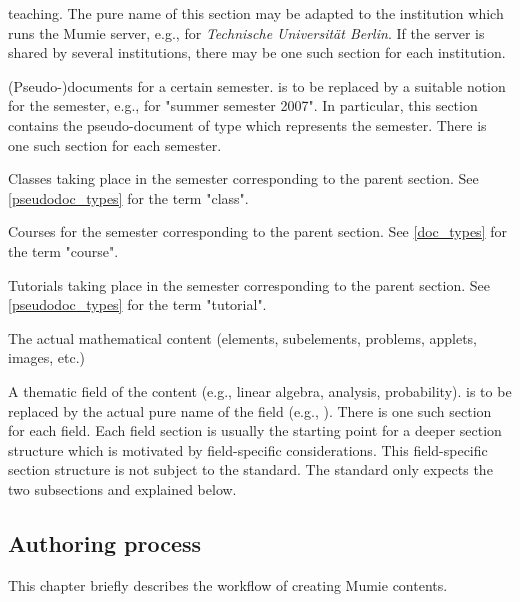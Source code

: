 \documentclass{generic}
\begin{document}
\begin{description}
  teaching. The pure name of this section may be adapted to the institution
  which runs the Mumie server, e.g.,  for \emph{Technische
    Universit\"at Berlin}. If the server is shared by several institutions,
  there may be one such section for each institution.
\item[\code{org/uni/\var{semester}}\label{sec_semester}] (Pseudo-)documents for
  a certain semester.  is to be replaced by a suitable
  notion for the semester, e.g.,  for "summer semester 2007".
  In particular, this section contains the pseudo-document of type
   which represents the semester. There is one such section for
  each semester.
\item[\code{org/uni/\var{semester}/classes}\label{sec_classes}] Classes taking
  place in the semester corresponding to the parent section. See
  \ref{pseudodoc_types} for the term "class".
\item[\code{org/uni/\var{semester}/courses}\label{sec_courses}] Courses for the
  semester corresponding to the parent section. See \ref{doc_types} for
  the term "course".
\item[\code{org/uni/\var{semester}/tutorials}\label{sec_tutorials}] Tutorials
  taking place in the semester corresponding to the parent section. See
  \ref{pseudodoc_types} for the term "tutorial".
\item[\code{content}\label{sec_content}]
  The actual mathematical content (elements, subelements, problems, applets,
  images, etc.)
\item[\code{content/\var{field}}\label{sec_field}] A thematic field of the
  content (e.g., linear algebra, analysis, probability).  is
  to be replaced by the actual pure name of the field (e.g.,
  ). There is one such section for each field. Each field
  section is usually the starting point for a deeper section structure which is
  motivated by field-specific considerations. This field-specific section
  structure is not subject to the standard. The standard only expects the two
  subsections  and  explained below.
\end{description}

\subsection{Authoring process}

This chapter briefly describes the workflow of creating Mumie contents.
\end{document}
